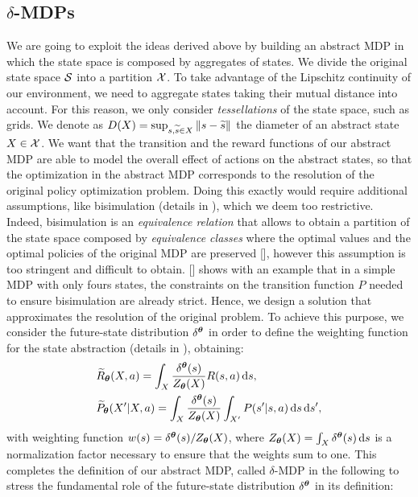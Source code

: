\subsection{$\delta$-\ac{MDPs}}
We are going to exploit the ideas derived above by building an abstract \ac{MDP} in which the state space is composed by aggregates of states. We divide the original state space $\mathcal{S}$ into a partition $\mathcal{X}$. To take advantage of the Lipschitz continuity of our environment, we need to aggregate states taking their mutual distance into account. For this reason, we only consider \textit{tessellations} of the state space, such as grids. 
%
We denote as $D(X) = \sup_{s,\widetilde{s}\in X}\left\|s-\widetilde{s}\right\|_{}$ the diameter of an abstract state $X\in\mathcal{X}$.
We want that the transition and the reward functions of our abstract \ac{MDP} are able to model the overall effect of actions on the abstract states, so that the optimization in the abstract \ac{MDP} corresponds to the resolution of the original policy optimization problem. Doing this exactly would require additional assumptions, like bisimulation (details in ), which we deem too restrictive. Indeed, bisimulation is an \emph{equivalence relation} that allows to obtain a partition of the state space composed by \emph{equivalence classes} where the optimal values and the optimal policies of the original \ac{MDP} are preserved [\cite{givan2003equivalence}], however this assumption is too stringent and difficult to obtain. [\cite{ferns2012metrics}] shows with an example that in a simple \ac{MDP} with only fours states, the constraints on the transition function $P$ needed to ensure bisimulation are already strict. Hence, we design a solution that approximates the resolution of the original problem. To achieve this purpose, we consider the future-state distribution $\delta^{\boldsymbol{\theta}}$ in order to define the weighting function for the state abstraction (details in ), obtaining:
%
\begin{align}
	&\widetilde{R}_{\boldsymbol{\theta}}(X,a) = \int_{X}\frac{\delta^{\boldsymbol{\theta}}(s)}{Z_{\boldsymbol{\theta}}(X)}R(s,a)\,\mathrm{d} s,\label{eq:abrew2} \\
	&\widetilde{P}_{\boldsymbol{\theta}}(X'|X,a) = \int_{X} \frac{\delta^{\boldsymbol{\theta}}(s)}{Z_{\boldsymbol{\theta}}(X)} \int_{X'} P(s'|s,a)\,\mathrm{d} s\,\mathrm{d} s',\label{eq:abtran2}
\end{align}
%
\sloppy with weighting function $w(s)=\delta^{\boldsymbol{\theta}}(s)/Z_{\boldsymbol{\theta}}(X)$, where $Z_{\boldsymbol{\theta}}(X)=\int_{X}\delta^{\boldsymbol{\theta}}(s)\,\mathrm{d} s$ is a normalization factor necessary to ensure that the weights sum to one.
This completes the definition of our abstract \ac{MDP}, called $\delta$-MDP in the following to stress the fundamental role of the future-state distribution $\delta^{\boldsymbol{\theta}}$ in its definition:
